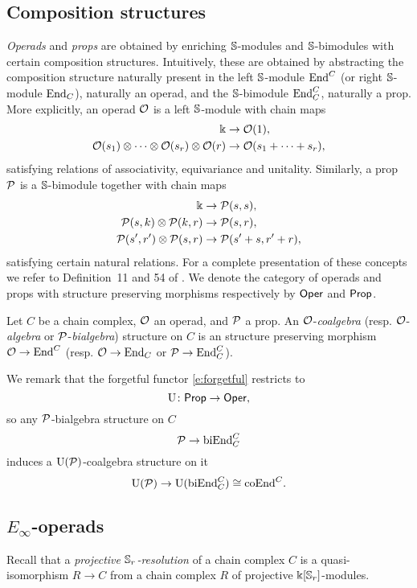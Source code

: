 \subsection{Composition structures}

\textit{Operads} and \textit{props} are obtained by enriching $\mathbb{S}$-modules and $\mathbb{S}$-bimodules with certain composition structures.
Intuitively, these are obtained by abstracting the composition structure naturally present in the left $\mathbb{S}$-module $\mathrm{End}^C$ (or right $\mathbb{S}$-module $\mathrm{End}_C$), naturally an operad, and the $\mathbb{S}$-bimodule $\mathrm{End}^C_C$, naturally a prop.
More explicitly, an operad $\mathcal{O}$ is a left $\mathbb{S}$-module with chain maps
\[
\begin{split}
	\Bbbk &\to \mathcal{O}(1), \\
	\mathcal{O}(s_1) \otimes \dotsb \otimes \mathcal{O}(s_r) \otimes \mathcal{O}(r) &\to \mathcal{O}(s_1 + \dots + s_r),
\end{split}
\]
satisfying relations of associativity, equivariance and unitality.
Similarly, a prop $\mathcal{P}$ is a $\mathbb{S}$-bimodule together with chain maps
\[
\begin{split}
	\Bbbk &\to \mathcal{P}(s,s), \\
	\mathcal{P}(s, k) \otimes \mathcal{P}(k, r) &\to \mathcal{P}(s,r), \\
	\mathcal{P}(s^\prime, r^\prime) \otimes \mathcal{P}(s, r) &\to \mathcal{P}(s^\prime+s, r^\prime+r),
\end{split}
\]
satisfying certain natural relations.
For a complete presentation of these concepts we refer to Definition~11 and 54 of \cite{markl2008props}.
We denote the category of operads and props with structure preserving morphisms respectively by $\mathsf{Oper}$ and $\mathsf{Prop}$.


Let $C$ be a chain complex, $\mathcal{O}$ an operad, and $\mathcal{P}$ a prop.
An $\mathcal{O}$-\textit{coalgebra} (resp. $\mathcal{O}$-\textit{algebra} or $\mathcal{P}$-\textit{bialgebra}) structure on $C$ is an structure preserving morphism $\mathcal{O} \to \mathrm{End}^C$ (resp. $\mathcal{O} \to \mathrm{End}_C$ or $\mathcal{P} \to \mathrm{End}_C^C$).

We remark that the forgetful functor \eqref{e:forgetful} restricts to
\[
\operatorname{U} \colon \mathsf{Prop} \to \mathsf{Oper},
\]
so any $\mathcal{P}$-bialgebra structure on $C$
\[
\mathcal{P} \to \mathrm{biEnd}_C^C
\]
induces a $\operatorname{U}(\mathcal{P})$-coalgebra structure on it
\[
\operatorname{U}(\mathcal{P}) \to \operatorname{U}(\mathrm{biEnd}_C^C) \cong \mathrm{coEnd}^C.
\]

\subsection{\texorpdfstring{${E_\infty}$}{E-infty}-operads}

Recall that a \textit{projective $\mathbb{S}_r$-resolution} of a chain complex $C$ is a quasi-isomorphism $R \to C$ from a chain complex $R$ of projective $\Bbbk[\mathbb{S}_r]$-modules.

